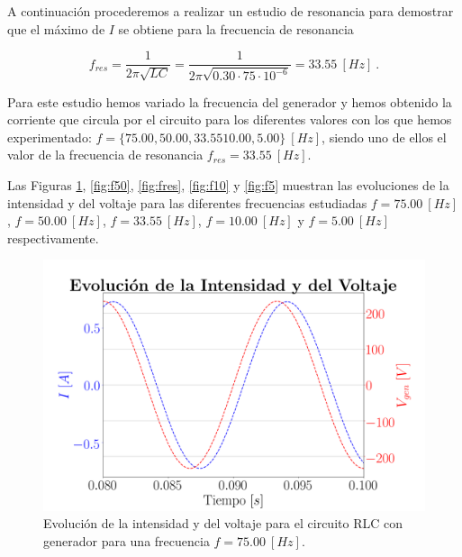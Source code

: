 \documentclass[journal]{IEEEtran}
\begin{document}
A continuación procederemos a realizar un estudio de resonancia para demostrar que el máximo de $I$ se obtiene para la frecuencia de resonancia 

\begin{equation}
f_{res} = \frac{1}{2\pi\sqrt{LC}} = \frac{1}{2\pi\sqrt{0.30\cdot 75\cdot 10^{-6}}} = 33.55~[Hz]~.
\end{equation}

Para este estudio hemos variado la frecuencia del generador y hemos obtenido la corriente que circula por el circuito para los diferentes valores con los que hemos experimentado: $f = \{ 75.00, 50.00, 33.55 10.00, 5.00\}~[Hz]$, siendo uno de ellos el valor de la frecuencia de resonancia $f_{res} = 33.55~[Hz]$.

Las Figuras \ref{fig:f75}, \ref{fig:f50}, \ref{fig:fres}, \ref{fig:f10} y \ref{fig:f5} muestran las evoluciones de la intensidad y del voltaje para las diferentes frecuencias estudiadas $f=75.00~[Hz]$, $f=50.00~[Hz]$, $f=33.55~[Hz]$, $f=10.00~[Hz]$ y $f=5.00~[Hz]$ respectivamente.

\begin{figure}[!htb]
    \centering
    \includegraphics[width=\linewidth,trim={0 0 0 55},clip]{f75.png}
    \caption{Evolución de la intensidad y del voltaje para el circuito RLC con generador para una frecuencia $f = 75.00~[Hz]$.}
    \label{fig:f75}
\end{figure}

\newpage
\end{document}
